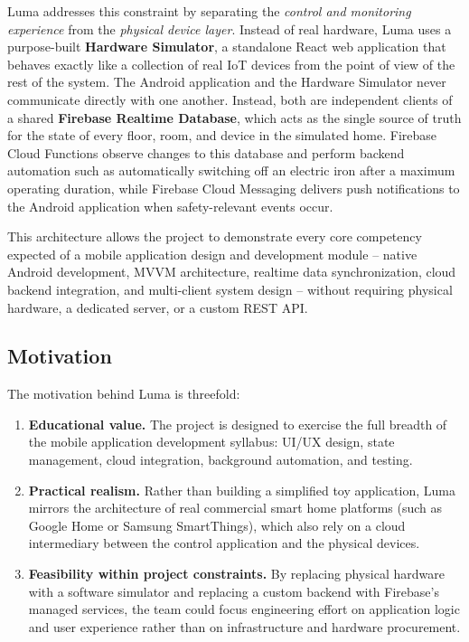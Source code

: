 \documentclass[11pt,a4paper]{article}
\begin{document}
Luma addresses this constraint by separating the \emph{control and monitoring experience} from the \emph{physical device layer}. Instead of real hardware, Luma uses a purpose-built \textbf{Hardware Simulator}, a standalone React web application that behaves exactly like a collection of real IoT devices from the point of view of the rest of the system. The Android application and the Hardware Simulator never communicate directly with one another. Instead, both are independent clients of a shared \textbf{Firebase Realtime Database}, which acts as the single source of truth for the state of every floor, room, and device in the simulated home. Firebase Cloud Functions observe changes to this database and perform backend automation such as automatically switching off an electric iron after a maximum operating duration, while Firebase Cloud Messaging delivers push notifications to the Android application when safety-relevant events occur.

This architecture allows the project to demonstrate every core competency expected of a mobile application design and development module -- native Android development, MVVM architecture, realtime data synchronization, cloud backend integration, and multi-client system design -- without requiring physical hardware, a dedicated server, or a custom REST API.

\subsection{Motivation}
The motivation behind Luma is threefold:
\begin{enumerate}[label=(\roman*)]
    \item \textbf{Educational value.} The project is designed to exercise the full breadth of the mobile application development syllabus: UI/UX design, state management, cloud integration, background automation, and testing.
    \item \textbf{Practical realism.} Rather than building a simplified toy application, Luma mirrors the architecture of real commercial smart home platforms (such as Google Home or Samsung SmartThings), which also rely on a cloud intermediary between the control application and the physical devices.
    \item \textbf{Feasibility within project constraints.} By replacing physical hardware with a software simulator and replacing a custom backend with Firebase's managed services, the team could focus engineering effort on application logic and user experience rather than on infrastructure and hardware procurement.
\end{enumerate}
\end{document}
